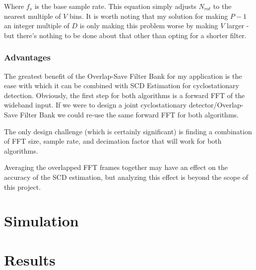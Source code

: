 \documentclass[12pt]{report}
\begin{document}
Where $f_s$ is the base sample rate. This equation simply adjusts $N_{rot}$ to
the nearest multiple of $V$ bins. It is worth noting that my solution for
making $P-1$ an integer multiple of $D$ is only making this problem worse by
making $V$ larger - but there's nothing to be done about that other than opting
for a shorter filter.

\subsection{Advantages}
\label{sec:os_scd_estimation}

The greatest benefit of the Overlap-Save Filter Bank for my application is
the ease with which it can be combined with SCD Estimation for cyclostationary
detection. Obviously, the first step for both algorithms is a forward FFT of the
wideband input. If we were to design a joint cyclostationary
detector/Overlap-Save Filter Bank we could re-use the same forward FFT for both
algorithms.

The only design challenge (which is certainly significant) is finding
a combination of FFT size, sample rate, and decimation factor that will work
for both algorithms.



Averaging the overlapped FFT frames together may have an effect on the accuracy
of the SCD estimation, but analyzing this effect is beyond the scope of this
project.

\chapter{Simulation}
\label{sec:sim}

\chapter{Results}
\label{sec:results}
\end{document}
